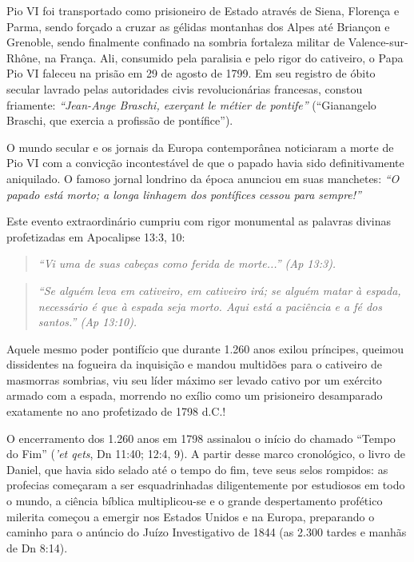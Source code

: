 Pio VI foi transportado como prisioneiro de Estado através de Siena, Florença e Parma, sendo forçado a cruzar as gélidas montanhas dos Alpes até Briançon e Grenoble, sendo finalmente confinado na sombria fortaleza militar de Valence-sur-Rhône, na França. Ali, consumido pela paralisia e pelo rigor do cativeiro, o Papa Pio VI faleceu na prisão em 29 de agosto de 1799. Em seu registro de óbito secular lavrado pelas autoridades civis revolucionárias francesas, constou friamente: \textit{``Jean-Ange Braschi, exerçant le métier de pontife''} (``Gianangelo Braschi, que exercia a profissão de pontífice'').

O mundo secular e os jornais da Europa contemporânea noticiaram a morte de Pio VI com a convicção incontestável de que o papado havia sido definitivamente aniquilado. O famoso jornal londrino da época anunciou em suas manchetes: \textit{``O papado está morto; a longa linhagem dos pontífices cessou para sempre!''}

Este evento extraordinário cumpriu com rigor monumental as palavras divinas profetizadas em Apocalipse 13:3, 10:

\begin{quote}
\itshape ``Vi uma de suas cabeças como ferida de morte...'' (Ap 13:3).
\end{quote}


\begin{quote}
\itshape ``Se alguém leva em cativeiro, em cativeiro irá; se alguém matar à espada, necessário é que à espada seja morto. Aqui está a paciência e a fé dos santos.'' (Ap 13:10).
\end{quote}


Aquele mesmo poder pontifício que durante 1.260 anos exilou príncipes, queimou dissidentes na fogueira da inquisição e mandou multidões para o cativeiro de masmorras sombrias, viu seu líder máximo ser levado cativo por um exército armado com a espada, morrendo no exílio como um prisioneiro desamparado exatamente no ano profetizado de 1798 d.C.!

O encerramento dos 1.260 anos em 1798 assinalou o início do chamado ``Tempo do Fim'' (\textit{'et qets}, Dn 11:40; 12:4, 9). A partir desse marco cronológico, o livro de Daniel, que havia sido selado até o tempo do fim, teve seus selos rompidos: as profecias começaram a ser esquadrinhadas diligentemente por estudiosos em todo o mundo, a ciência bíblica multiplicou-se e o grande despertamento profético milerita começou a emergir nos Estados Unidos e na Europa, preparando o caminho para o anúncio do Juízo Investigativo de 1844 (as 2.300 tardes e manhãs de Dn 8:14).



